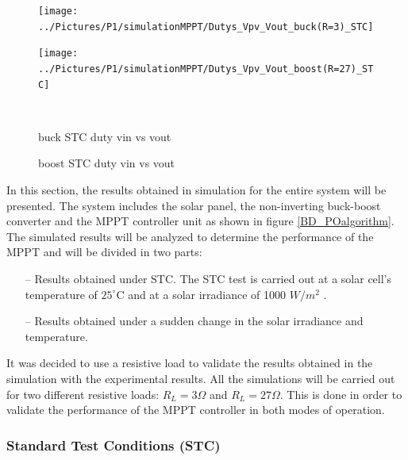 \begin{figure}[H]
	\begin{minipage}[c]{0.6\textwidth}
		\centering
		\texttt{[image: ../Pictures/P1/simulationMPPT/Dutys\_Vpv\_Vout\_buck(R=3)\_STC]} %
	\end{minipage}%
	\hfill
	\begin{minipage}[c]{0.6\textwidth}
		\centering
		\texttt{[image: ../Pictures/P1/simulationMPPT/Dutys\_Vpv\_Vout\_boost(R=27)\_STC]} %
	\end{minipage} \\ %
	\begin{minipage}[t]{0.6\textwidth}
		\caption{buck STC duty vin vs vout} %
		\label{buckSTC_duty}
	\end{minipage}%
	\hfill
	\begin{minipage}[t]{0.6\textwidth}
		\caption{boost STC duty vin vs vout} %
		\label{boostSTC_duty}
	\end{minipage}
\end{figure}
\fi 

In this section, the results obtained in simulation for the entire system will be presented. The system includes the solar panel, the non-inverting buck-boost converter and the MPPT controller unit as shown in figure \ref{BD_POalgorithm}. The simulated results will be analyzed to determine the performance of the MPPT and will be divided in two parts: 
\begin{itemize}
	\item[--] Results obtained under STC. The STC test is carried out at a solar cell's temperature of $25^\circ$C and at a solar irradiance of 1000 $W/ m^2$ \cite{handbook}.
	\item[--] Results obtained under a sudden change in the solar irradiance and temperature.
\end{itemize}

 It was decided to use a resistive load to validate the results obtained in the simulation with the experimental results. All the simulations will be carried out for two different resistive loads: $R_{L}=3\Omega$ and $R_{L}=27\Omega$. This is done in order to validate the performance of the MPPT controller in both modes of operation.
 \subsubsection*{Standard Test Conditions (STC)}
 
